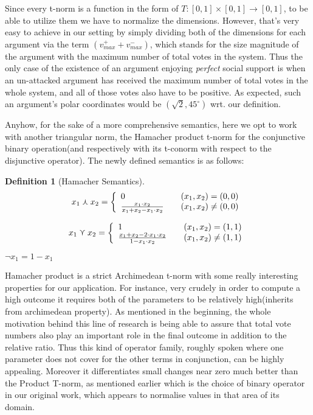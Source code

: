 \documentclass{article}
\newtheorem{definition}{Definition}
\begin{document}
{\begin{itemize}
Since every t-norm is a function in the form of $T: [0, 1] \times [0, 1] \rightarrow [0, 1] $, to be able to utilize them we have to normalize the dimensions. However, that's very easy to achieve in our setting by simply dividing both of the dimensions for each argument via the term $(v^{+}_{max} + v^{-}_{max})$, which stands for the size magnitude of the argument with the maximum number of total votes in the system. Thus the only case of the existence of an argument enjoying \textit{perfect} social support is when an un-attacked argument has received the maximum number of total votes in the whole system, and all of those votes also have to be positive. As expected, such an argument's polar coordinates would be $(\sqrt 2, 45^{\circ})$ wrt. our definition.

Anyhow, for the sake of a more comprehensive semantics, here we opt to work with another triangular norm, the Hamacher product t-norm for the conjunctive binary operation(and respectively with its t-conorm with respect to the disjunctive operator). The newly defined semantics is as follows:

\begin{definition} [Hamacher Semantics]

\[  x_{1}\curlywedge x_{2}= \left\{ 
  \begin{array}{l l}
    0 & \quad ( x_{1},  x_{2}) = (0, 0)\\
    \frac{ x_{1}\cdot  x_{2}}{ x_{1}+ x_{2}- x_{1}\cdot  x_{2}} & \quad  ( x_{1},  x_{2}) \neq (0, 0)
  \end{array} \right.\]

\[  x_{1}\curlyvee x_{2}= \left\{ 
  \begin{array}{l l}
    1 & \quad ( x_{1},  x_{2}) = (1, 1)\\
    \frac{x_{1}+  x_{2} - 2 \cdot x_{1} \cdot x_{2}}{1- x_{1}\cdot  x_{2}} & \quad  ( x_{1},  x_{2}) \neq (1, 1)
  \end{array} \right.\]

\begin{center}
$\lnot x_{1}=1-x_{1}$
\end{center}
\end{definition}

 Hamacher product is a strict Archimedean t-norm with some really interesting properties for our application. For instance, very crudely in order to compute a high outcome it requires both of the parameters to be relatively high(inherits from archimedean property). As mentioned in the beginning, the whole motivation behind this line of research is being able to assure that total vote numbers also play an important role in the final outcome in addition to the relative ratio. Thus this kind of operator family, roughly spoken where  one parameter does not cover for the other terms in conjunction,  can be highly appealing. Moreover it differentiates small changes near zero much better than the Product T-norm, as mentioned earlier which is the choice of binary operator in our original work, which appears to normalise values in that area of its domain.


\end{itemize}}
\end{document}
